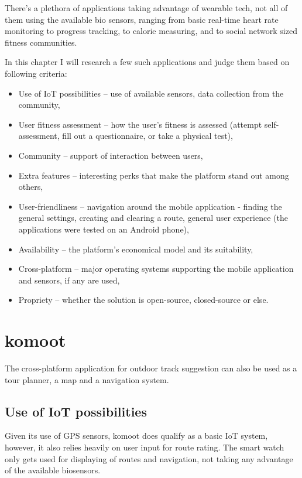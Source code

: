 There's a plethora of applications taking advantage of wearable tech, not all of them using the available bio sensors, ranging from basic real-time heart rate monitoring to progress tracking, to calorie measuring, and to social network sized fitness communities.

In this chapter I will research a few such applications and judge them based on following criteria:
\begin{itemize}
    \item Use of IoT possibilities -- use of available sensors, data collection from the community,
    \item User fitness assessment -- how the user's fitness is assessed (attempt self-assessment, fill out a questionnaire, or take a physical test),
    \item Community -- support of interaction between users,
    \item Extra features -- interesting perks that make the platform stand out among others,
    \item User-friendliness -- navigation around the mobile application - finding the general settings, creating and clearing a route, general user experience (the applications were tested on an Android phone),
    \item Availability -- the platform's economical model and its suitability,
    \item Cross-platform -- major operating systems supporting the mobile application and sensors, if any are used,
    \item Propriety -- whether the solution is open-source, closed-source or else.
\end{itemize}

\section{komoot}
The cross-platform application for outdoor track suggestion can also be used as a tour planner, a map and a navigation system.

\subsection*{Use of IoT possibilities}
Given its use of GPS sensors, komoot does qualify as a basic IoT system, however, it also relies heavily on user input for route rating.
The smart watch only gets used for displaying of routes and navigation, not taking any advantage of the available biosensors.
